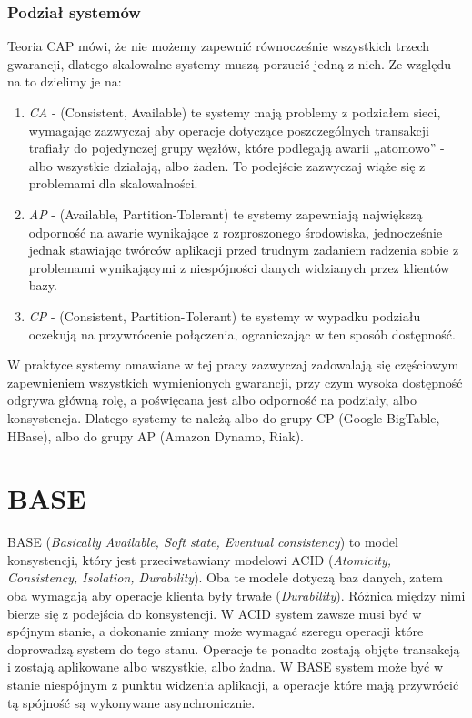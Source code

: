 \subsubsection*{Podział systemów}

Teoria CAP mówi, że nie możemy zapewnić równocześnie wszystkich trzech gwarancji, dlatego skalowalne systemy muszą porzucić jedną z nich. 
Ze względu na to dzielimy je na:

\begin{enumerate}
 \item \emph{CA} - (Consistent, Available) te systemy mają problemy z podziałem sieci, wymagając zazwyczaj aby operacje dotyczące poszczególnych transakcji trafiały do pojedynczej grupy węzłów, które podlegają awarii ,,atomowo'' - albo wszystkie działają, albo żaden. 
 To podejście zazwyczaj wiąże się z problemami dla skalowalności.
 \item \emph{AP} - (Available, Partition-Tolerant) te systemy zapewniają największą odporność na awarie wynikające z rozproszonego środowiska, jednocześnie jednak stawiając twórców aplikacji przed trudnym zadaniem radzenia sobie z problemami wynikającymi z niespójności danych widzianych przez klientów bazy.
 \item \emph{CP} - (Consistent, Partition-Tolerant) te systemy w wypadku podziału oczekują na przywrócenie połączenia, ograniczając w ten sposób dostępność.
\end{enumerate}

W praktyce systemy omawiane w tej pracy zazwyczaj zadowalają się częściowym zapewnieniem wszystkich wymienionych gwarancji, przy czym wysoka dostępność odgrywa główną rolę, a poświęcana jest albo odporność na podziały, albo konsystencja. 
Dlatego systemy te należą albo do grupy CP (Google BigTable, HBase), albo do grupy AP (Amazon Dynamo, Riak).

\section{BASE}

BASE (\emph{Basically Available, Soft state, Eventual consistency}) to model konsystencji, który jest przeciwstawiany modelowi ACID (\emph{Atomicity, Consistency, Isolation, Durability}). 
Oba te modele dotyczą baz danych, zatem oba wymagają aby operacje klienta były trwałe (\emph{Durability}).
Różnica między nimi bierze się z podejścia do konsystencji.
W ACID system zawsze musi być w spójnym stanie, a dokonanie zmiany może wymagać szeregu operacji które doprowadzą system do tego stanu.
Operacje te ponadto zostają objęte transakcją i zostają aplikowane albo wszystkie, albo żadna.
W BASE system może być w stanie niespójnym z punktu widzenia aplikacji, a operacje które mają przywrócić tą spójność są wykonywane asynchronicznie.

